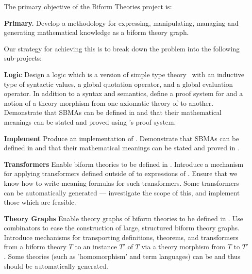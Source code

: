 \documentclass[fleqn]{llncs}
\begin{document}
The primary objective of the Biform Theories project is:

\bi

  \item[] \textbf{Primary.} Develop a methodology for expressing,
    manipulating, managing and generating mathematical knowledge 
    as a biform theory graph.

\ei

\noindent
Our strategy for achieving this is to break down the problem
into the following sub-projects:

\bi

  \item[]\textbf{Logic} Design a logic  which is a
    version of simple type theory~\cite{Farmer08} with an inductive
    type of syntactic values, a global quotation operator, and a
    global evaluation operator.  In addition to a syntax and
    semantics, define a proof system for  and a notion of a
    theory morphism from one axiomatic theory of  to
    another.  Demonstrate that SBMAs can be defined in  and
    that their mathematical meanings can be stated and proved using
    's proof system.

\medskip

  \item[]\textbf{Implement} Produce an implementation  of
    .  Demonstrate that SBMAs can be defined in
     and that their mathematical meanings can be stated
    and proved in .

\medskip

  \item[]\textbf{Transformers} Enable biform theories to be defined in
    .  Introduce a mechanism for applying transformers
    defined outside of  to expressions of .
    Ensure that we know how to write meaning formulas for such
    transformers. Some transformers can be automatically generated
    --- investigate the scope of this, and implement those which
    are feasible.

\medskip

  \item[]\textbf{Theory Graphs} Enable theory graphs of biform theories
    to be defined in .  Use combinators to ease the
    construction of large, structured biform theory graphs.  Introduce
    mechanisms for
    transporting definitions, theorems, and transformers from a biform
    theory $T$ to an instance $T'$ of $T$ via a theory morphism from
    $T$ to $T'$. Some theories (such as 'homomorphism' and term
    languages) can be and thus should be automatically generated.
\end{document}

